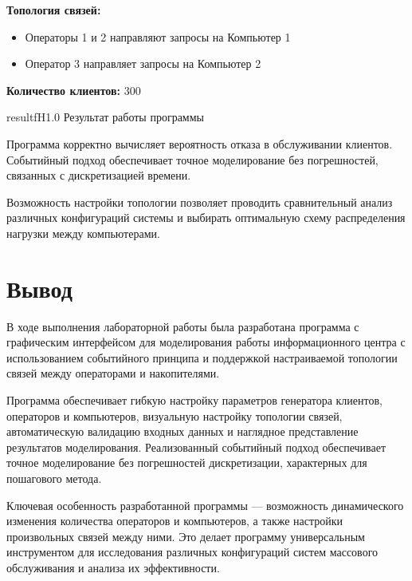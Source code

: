 \textbf{Топология связей:}
\begin{itemize}
    \item Операторы 1 и 2 направляют запросы на Компьютер 1
    \item Оператор 3 направляет запросы на Компьютер 2
\end{itemize}

\textbf{Количество клиентов:} 300

	{result}{f}{H}{1.0\textwidth}
	{Результат работы программы}

Программа корректно вычисляет вероятность отказа в обслуживании клиентов. Событийный подход обеспечивает точное моделирование без погрешностей, связанных с дискретизацией времени.

Возможность настройки топологии позволяет проводить сравнительный анализ различных конфигураций системы и выбирать оптимальную схему распределения нагрузки между компьютерами.

\section{Вывод}

В ходе выполнения лабораторной работы была разработана программа с графическим интерфейсом для моделирования работы информационного центра с использованием событийного принципа и поддержкой настраиваемой топологии связей между операторами и накопителями.

Программа обеспечивает гибкую настройку параметров генератора клиентов, операторов и компьютеров, визуальную настройку топологии связей, автоматическую валидацию входных данных и наглядное представление результатов моделирования. Реализованный событийный подход обеспечивает точное моделирование без погрешностей дискретизации, характерных для пошагового метода.

Ключевая особенность разработанной программы — возможность динамического изменения количества операторов и компьютеров, а также настройки произвольных связей между ними. Это делает программу универсальным инструментом для исследования различных конфигураций систем массового обслуживания и анализа их эффективности.
